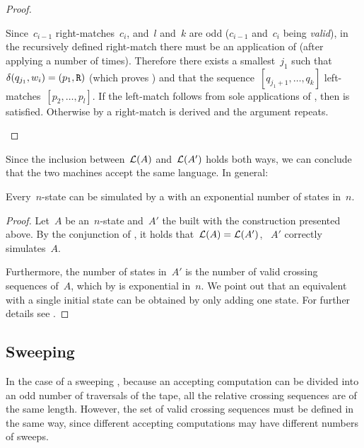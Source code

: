 \begin{proof}
\begin{description}
		      Since~$c_{i-1}$ right-matches~$c_i$, and~$l$ and~$k$ are odd ($c_{i-1}$ and~$c_i$ being \emph{valid}), in the recursively defined right-match there must be an application of  (after applying  a number of times).
		      Therefore there exists a smallest~$j_1$ such that~$\delta(q_{j_1},w_i)=(p_1,\mathtt R)$ (which proves ) and that the sequence~$[q_{j_1+1},\dots,q_k]$ left-matches~$[p_2,\dots,p_l]$.
		      If the left-match follows from sole applications of , then  is satisfied.
		      Otherwise by  a right-match is derived and the argument repeats. \qedhere
	\end{description}
\end{proof}

Since the inclusion between~$\mathcal L(A)$ and~$\mathcal L(A')$ holds both ways, we can conclude that the two machines accept the same language.
In general:
\begin{thrm}\label{thm:2DFAto1NFA}
	Every~$n$-state \TDFA can be simulated by a \ONFA with an exponential number of states in~$n$.
\end{thrm}
\begin{proof}
	Let~$A$ be an~$n$-state \TDFA and~$A'$ the \ONFA built with the construction presented above.
	By the conjunction of , it holds that~$\mathcal L(A)=\mathcal L(A')$, \ie~$A'$ correctly simulates~$A$.

	Furthermore, the number of states in~$A'$ is the number of valid crossing sequences of~$A$, which by  is exponential in~$n$.
	We point out that an equivalent \ONFA with a single initial state can be obtained by only adding one state. For further details see .
\end{proof}


\subsection{Sweeping \texorpdfstring{\TDFAs}{2DFAs}}\label{sub:swep2DFA}
In the case of a sweeping \TDFA, because an accepting computation can be divided into an odd number of traversals of the tape, all the relative crossing sequences are of the same length.
However, the set of valid crossing sequences must be defined in the same way, since different accepting computations may have different numbers of sweeps.

